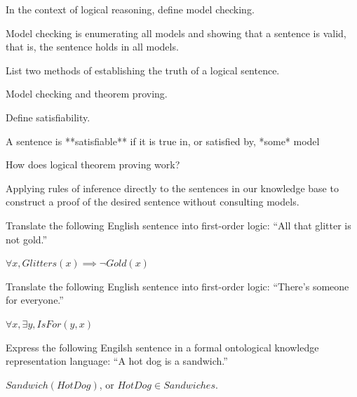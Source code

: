 \begin{questions}
\question In the context of logical reasoning, define model checking.

\begin{solution}[.75in]
Model checking is enumerating all models and showing that a sentence is valid, that is, the sentence holds in all models.
\end{solution}

\question List two methods of establishing the truth of a logical sentence.

\begin{solution}[.75in]
Model checking and theorem proving.
\end{solution}

\question Define satisfiability.

\begin{solution}[.75in]
A sentence is **satisfiable** if it is true in, or satisfied by, *some* model
\end{solution}

\question How does logical theorem proving work?

\begin{solution}[.75in]
Applying rules of inference directly to the sentences in our knowledge base to construct a proof of the desired sentence without consulting models.
\end{solution}

\question Translate the following English sentence into first-order logic: ``All that glitter is not gold.''

\begin{solution}[.75in]
$\forall x, Glitters(x) \implies \neg Gold(x)$
\end{solution}

\question Translate the following English sentence into first-order logic: ``There's someone for everyone.''

\begin{solution}[.75in]
$\forall x, \exists y, IsFor(y, x)$
\end{solution}

\question Express the following Engilsh sentence in a formal ontological knowledge representation language: ``A hot dog is a sandwich.''

\begin{solution}[.75in]
$Sandwich(HotDog)$, or $HotDog \in Sandwiches$.
\end{solution}

\end{questions}


